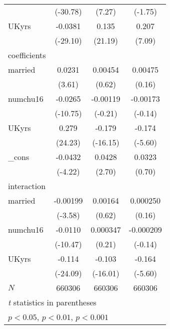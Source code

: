 \begin{table}[htbp]
\begin{tabular}{l*{3}{c}}
            &    (-30.78)         &      (7.27)         &     (-1.75)         \\
[1em]
UKyrs       &     -0.0381\sym{***}&       0.135\sym{***}&       0.207\sym{***}\\
            &    (-29.10)         &     (21.19)         &      (7.09)         \\
\hline
coefficients&                     &                     &                     \\
married     &      0.0231\sym{***}&     0.00454         &     0.00475         \\
            &      (3.61)         &      (0.62)         &      (0.16)         \\
[1em]
numchu16    &     -0.0265\sym{***}&    -0.00119         &    -0.00173         \\
            &    (-10.75)         &     (-0.21)         &     (-0.14)         \\
[1em]
UKyrs       &       0.279\sym{***}&      -0.179\sym{***}&      -0.174\sym{***}\\
            &     (24.23)         &    (-16.15)         &     (-5.60)         \\
[1em]
\_cons      &     -0.0432\sym{***}&      0.0428\sym{**} &      0.0323         \\
            &     (-4.22)         &      (2.70)         &      (0.70)         \\
\hline
interaction &                     &                     &                     \\
married     &    -0.00199\sym{***}&     0.00164         &    0.000250         \\
            &     (-3.58)         &      (0.62)         &      (0.16)         \\
[1em]
numchu16    &     -0.0110\sym{***}&    0.000347         &   -0.000209         \\
            &    (-10.47)         &      (0.21)         &     (-0.14)         \\
[1em]
UKyrs       &      -0.114\sym{***}&      -0.103\sym{***}&      -0.164\sym{***}\\
            &    (-24.09)         &    (-16.01)         &     (-5.60)         \\
\hline
\(N\)       &      660306         &      660306         &      660306         \\
\hline\hline
\multicolumn{4}{l}{\footnotesize \textit{t} statistics in parentheses}\\
\multicolumn{4}{l}{\footnotesize \sym{*} \(p<0.05\), \sym{**} \(p<0.01\), \sym{***} \(p<0.001\)}\\
\end{tabular}
\end{table}
